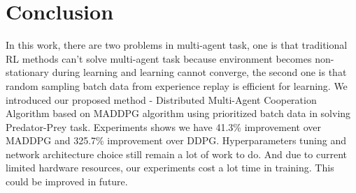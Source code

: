 \documentclass[11pt,twocolumn]{jarticle} %
\begin{document}
\section{Conclusion}
In this work, there are two problems in multi-agent task, one is that traditional RL methods can't solve multi-agent task because environment becomes non-stationary during learning and learning cannot converge, the second one is that random sampling batch data from experience replay is efficient for learning. We introduced our proposed method - Distributed Multi-Agent Cooperation Algorithm based on MADDPG algorithm using prioritized batch data in solving Predator-Prey task. Experiments shows we have 41.3\% improvement over MADDPG and 325.7\% improvement over DDPG.
Hyperparameters tuning and network architecture choice still remain a lot of work to do.
And due to current limited hardware resources, our experiments cost a lot time in training. This could be improved in future.
\end{document}

